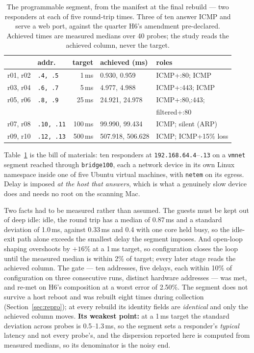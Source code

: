 \documentclass[conference]{IEEEtran}
\begin{document}
\begin{table}[tb]
\caption{The programmable segment, from the manifest at the final rebuild ---
two responders at each of five round-trip times. Three of ten answer ICMP and
serve a web port, against the quarter H6's amendment pre-declared. Achieved
times are measured medians over 40 probes; the study reads the achieved column,
never the target.}
\label{tab:testbed}
\centering
\footnotesize
\setlength{\tabcolsep}{3.4pt}
\begin{tabular}{@{}llrll@{}}
\toprule
 & addr. & target & achieved (ms) & roles\\
\midrule
r01, r02 & \texttt{.4, .5}   & 1\,ms   & 0.930, 0.959   & ICMP+:80; ICMP\\
r03, r04 & \texttt{.6, .7}   & 5\,ms   & 4.977, 4.988   & ICMP+:443; ICMP\\
r05, r06 & \texttt{.8, .9}   & 25\,ms  & 24.921, 24.978 & ICMP+:80,:443;\\
         &                   &         &                & \quad filtered+:80\\
r07, r08 & \texttt{.10, .11} & 100\,ms & 99.990, 99.434 & ICMP; silent (ARP)\\
r09, r10 & \texttt{.12, .13} & 500\,ms & 507.918, 506.628 & ICMP; ICMP+15\% loss\\
\bottomrule
\end{tabular}
\end{table}


Table~\ref{tab:testbed} is the bill of materials: ten responders at
\texttt{192.168.64.4}--\texttt{.13} on a \texttt{vmnet} segment reached through
\texttt{bridge100}, each a network device in its own Linux namespace inside one
of five Ubuntu virtual machines, with \texttt{netem} on its egress. Delay is
imposed \emph{at the host that answers}, which is what a genuinely slow device
does and needs no root on the scanning Mac.

Two facts had to be measured rather than assumed. The guests must be kept out
of deep idle: idle, the round trip has a median of 0.87\,ms and a standard
deviation of 1.0\,ms, against 0.33\,ms and 0.4 with one core held busy, so the
idle-exit path alone exceeds the smallest delay the segment imposes. And
open-loop shaping overshoots by $+16\%$ at a 1\,ms target, so configuration
closes the loop until the measured median is within 2\% of target; every later
stage reads the achieved column. The gate --- ten addresses, five delays, each
within 10\% of configuration on three consecutive runs, distinct hardware
addresses --- was met, and re-met on H6's composition at a worst error of
2.50\%. The segment does not survive a host reboot and was rebuilt eight times
during collection (Section~\ref{sec:repro}); at every rebuild its identity
fields are \emph{identical} and only the achieved column moves.
\textbf{Its weakest point:} at a 1\,ms target the standard deviation
across probes is 0.5--1.3\,ms, so the segment sets a responder's \emph{typical}
latency and not every probe's, and the dispersion reported here is computed
from measured medians, so its denominator is the noisy end.
\end{document}
